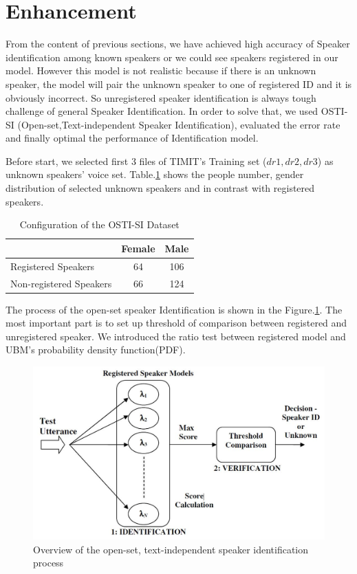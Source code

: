 \documentclass[12pt,DIV14,BCOR12mm,a4paper,footinclude=false,headinclude,parskip=half-,twoside,openright,cleardoublepage=empty,toc=index,bibliography=totoc,listof=totoc]{scrreprt}
\numberwithin{equation}{chapter}
\begin{document}
\section{Enhancement}
From the content of previous sections, we have achieved high accuracy of Speaker identification among known speakers or we could see speakers registered in our model. However this model is not realistic because if there is an unknown speaker, the model will pair the unknown speaker to one of registered ID and it is obviously incorrect. So unregistered speaker identification is always tough challenge of general Speaker Identification. In order to solve that, we used OSTI-SI (Open-set,Text-independent Speaker Identification), evaluated the error rate and finally optimal the performance of Identification model.

Before start, we selected first 3 files of TIMIT's Training set ($dr1,dr2,dr3$) as unknown speakers' voice set. Table.\ref{enh_data} shows the people number, gender distribution of selected unknown speakers and in contrast with registered speakers.

\begin{table}
	\centering
	\caption{Configuration of the OSTI-SI Dataset}
	\label{enh_data}
	\begin{tabular}{lcc}
		\toprule
		& Female & Male  \\
		\midrule
		Registered Speakers & 64 & 106 \\
		Non-registered Speakers & 66 & 124 \\
		\bottomrule
	\end{tabular}
\end{table}

The process of the open-set speaker Identification is shown in the Figure.\ref{OSIE}. The most important part is to set up threshold of comparison between registered and unregistered speaker. We introduced the ratio test between registered model and UBM's probability density function(PDF).

\begin{figure}
	\centering
	\includegraphics[scale=0.6]{image/ProcessOSIE}
	\caption{Overview of the open-set, text-independent speaker identification process}
	\label{OSIE}
\end{figure}
\end{document}
